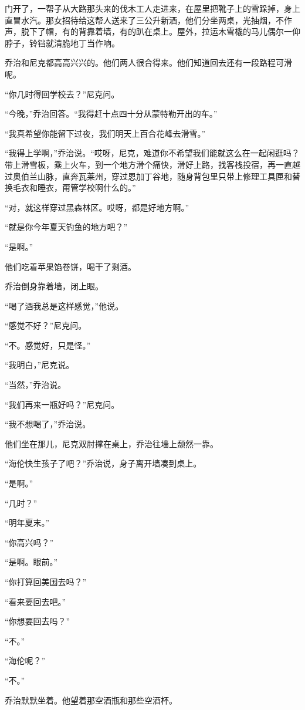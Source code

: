 门开了，一帮子从大路那头来的伐木工人走进来，在屋里把靴子上的雪跺掉，身上直冒水汽。那女招待给这帮人送来了三公升新酒，他们分坐两桌，光抽烟，不作声，脱下了帽，有的背靠着墙，有的趴在桌上。屋外，拉运木雪橇的马儿偶尔一仰脖子，铃铛就清脆地丁当作响。

乔治和尼克都高高兴兴的。他们两人很合得来。他们知道回去还有一段路程可滑呢。

“你几时得回学校去？”尼克问。

“今晚，”乔治回答。“我得赶十点四十分从蒙特勒开出的车。”

“我真希望你能留下过夜，我们明天上百合花峰去滑雪。”

“我得上学啊，”乔治说。“哎呀，尼克，难道你不希望我们能就这么在一起闲逛吗？带上滑雪板，乘上火车，到一个地方滑个痛快，滑好上路，找客栈投宿，再一直越过奥伯兰山脉，直奔瓦莱州，穿过恩加丁谷地，随身背包里只带上修理工具匣和替换毛衣和睡衣，甭管学校啊什么的。”

“对，就这样穿过黑森林区。哎呀，都是好地方啊。”

“就是你今年夏天钓鱼的地方吧？”

“是啊。”

他们吃着苹果馅卷饼，喝干了剩酒。

乔治倒身靠着墙，闭上眼。

“喝了酒我总是这样感觉，”他说。

“感觉不好？”尼克问。

“不。感觉好，只是怪。”

“我明白，”尼克说。

“当然，”乔治说。

“我们再来一瓶好吗？”尼克问。

“我不想喝了，”乔治说。

他们坐在那儿，尼克双肘撑在桌上，乔治往墙上颓然一靠。

“海伦快生孩子了吧？”乔治说，身子离开墙凑到桌上。

“是啊。”

“几时？”

“明年夏末。”

“你高兴吗？”

“是啊。眼前。”

“你打算回美国去吗？”

“看来要回去吧。”

“你想要回去吗？”

“不。”

“海伦呢？”

“不。”

乔治默默坐着。他望着那空酒瓶和那些空酒杯。

